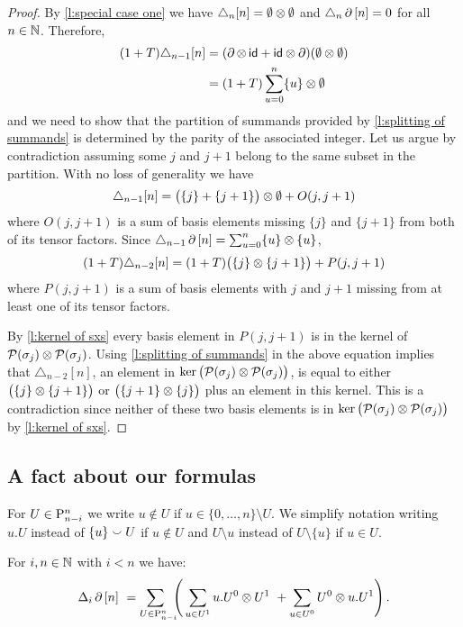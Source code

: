 \begin{proof}
	By \cref{l:special case one} we have $\triangle_{n} [n] = \emptyset \ot \emptyset$ and $\triangle_{n} \bd \, [n] = 0$ for all $n \in \N$.
	Therefore,
	\begin{align*}
	(1+T) \triangle_{n-1} [n] &=
	(\bd \ot \, \id + \id \ot \bd) (\emptyset \ot \emptyset) \\ &=
	(1+T) \sum_{u=0}^n \{u\} \ot \emptyset
	\end{align*}
	and we need to show that the partition of summands provided by \cref{l:splitting of summands} is determined by the parity of the associated integer.
	Let us argue by contradiction assuming some $j$ and $j+1$ belong to the same subset in the partition.
	With no loss of generality we have
	\[
	\triangle_{n-1} [n] = \big( \{j\} + \{j+1\} \big) \ot \emptyset + O(j, j+1)
	\]
	where $O(j, j+1)$ is a sum of basis elements missing $\{j\}$ and $\{j+1\}$ from both of its tensor factors.
	Since $\triangle_{n-1} \bd \, [n] = \sum_{u=0}^{n} \{u\} \ot \{u\}$,
	\[
	(1+T) \triangle_{n-2} [n] = (1+T) \big( \{j\} \ot \{j+1\} \big) + P(j, j+1)
	\]
	where $P(j, j+1)$ is a sum of basis elements with $j$ and $j+1$ missing from at least one of its tensor factors.

	By \cref{l:kernel of sxs} every basis element in $P(j,j+1)$ is in the kernel of $\cP(\sigma_j) \ot \cP(\sigma_j)$.
	Using \cref{l:splitting of summands} in the above equation implies that $\triangle_{n-2} [n]$, an element in $\ker \big( \cP(\sigma_j) \ot \cP(\sigma_j) \big)$, is equal to either $\big( \{j\} \ot \{j+1\} \big)$ or $\big( \{j+1\} \ot \{j\} \big)$ plus an element in this kernel.
	This is a contradiction since neither of these two basis elements is in $\ker \big( \cP(\sigma_j) \ot \cP(\sigma_j) \big)$ by \cref{l:kernel of sxs}.
\end{proof}

\subsection{A fact about our formulas}

\begin{notation}
	For $U \in \P_{n-i}^n$ we write $u \notin U$ if $u \in \{0, \dots, n\} \setminus U$.
	We simplify notation writing $u.U$ instead of $\{u\} \union U$ if $u \notin U$ and $U \setminus u$ instead of $U \setminus \{u\}$ if $u \in U$.
\end{notation}

\begin{proposition} \label{p:from the other paper}
	For $i,n \in \N$ with $i < n$ we have:
	\[
	\Delta_i \bd \, [n] \ =
	\sum_{U \in \P_{n-i}^n \kern-5pt} \left( \,
	\sum_{u \in U^1} {u.U^0} \ot {U^1} \ +
	\sum_{u \in U^0} {U^0} \ot {u.U^1} \right).
	\]
\end{proposition}

